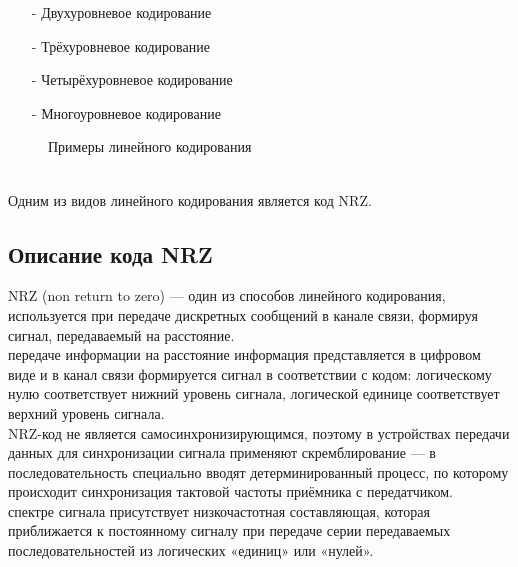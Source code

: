 \documentclass[a4paper14pt]{article}
\begin{document}
\begin{itemize}
    \item[-]Двухуровневое кодирование
    \item[-]Трёхуровневое кодирование
    \item[-]Четырёхуровневое кодирование
    \item[-]Многоуровневое кодирование
\end{itemize}
\newpage
\begin{figure}[h]
    \caption{Примеры линейного кодирования}
\end{figure}
\\
    Одним из видов линейного кодирования является код NRZ.
\newpage
\subsection{Описание кода NRZ}
 NRZ (non return to zero) — один из способов линейного кодирования, используется при передаче дискретных сообщений в канале связи, формируя сигнал, передаваемый на расстояние.\\
 передаче информации на расстояние информация представляется в цифровом виде и в канал связи формируется сигнал в соответствии с кодом: логическому нулю соответствует нижний уровень сигнала, логической единице соответствует верхний уровень сигнала.\\
\indent NRZ-код не является самосинхронизирующимся, поэтому в устройствах передачи данных для синхронизации сигнала применяют скремблирование — в последовательность специально вводят детерминированный процесс, по которому происходит синхронизация тактовой частоты приёмника с передатчиком.\\
 спектре сигнала присутствует низкочастотная составляющая, которая приближается к постоянному сигналу при передаче серии передаваемых последовательностей из логических «единиц» или «нулей».\\
\end{document}
